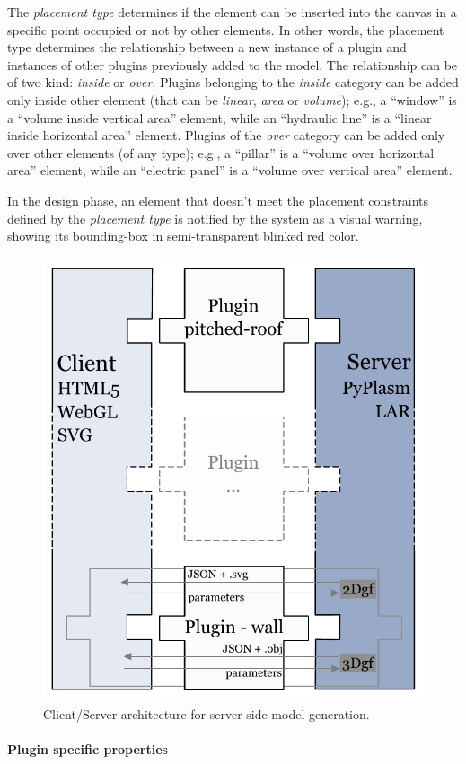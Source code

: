 \documentclass[a4paper,twoside]{article}
\begin{document}
The \emph{placement type} determines if the element can be inserted into the canvas in a specific point occupied or not by other elements. In other words, the {placement type} determines the relationship between a new instance of a plugin and instances of other plugins previously added to the model. The relationship can be of two kind: \emph{inside} or \emph{over}.
Plugins belonging to the \emph{inside} category can be added only inside other element (that can be \emph{linear}, \emph{area} or \emph{volume}); e.g., a ``window'' is a ``volume inside vertical area'' element,
while an ``hydraulic line'' is a ``linear inside horizontal area'' element.
Plugins of the \emph{over} category can be added only over other elements (of any type);
e.g., a ``pillar'' is a ``volume over horizontal area'' element,
while an ``electric panel'' is a ``volume over vertical area'' element.

In the design phase, an element that doesn't meet the placement constraints defined by the \emph{placement type} is notified by the system as a visual warning, showing its bounding-box in semi-transparent blinked red color.

\begin{figure}[htbp] %
   \centering

   \includegraphics[width=0.6\linewidth]{images/architecture-h}

   \caption{Client/Server architecture for server-side model generation.}
   \label{fig:c-s-arch}
\end{figure}

\paragraph{Plugin specific properties}
\end{document}
